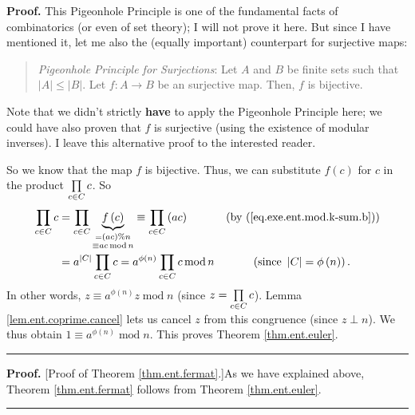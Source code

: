 \documentclass[numbers=enddot,12pt,final,onecolumn,notitlepage]{scrartcl}%
\numberwithin{exer}{subsection}
\theoremstyle{definition}
\newenvironment{statement}{\begin{quote}}{\end{quote}}
\newenvironment{proof}[1][Proof]{\noindent\textbf{#1.} }{\ \rule{0.5em}{0.5em}}
\let\prodnonlimits\prod
\renewcommand{\prod}{\prodnonlimits\limits}
\begin{document}
\begin{proof}
This Pigeonhole Principle is one of the fundamental facts of combinatorics (or
even of set theory); I will not prove it here. But since I have mentioned it,
let me also the (equally important) counterpart for surjective maps:

\begin{statement}
\textit{Pigeonhole Principle for Surjections}: Let $A$ and $B$ be finite sets
such that $\left\vert A\right\vert \leq\left\vert B\right\vert $. Let
$f:A\rightarrow B$ be an surjective map. Then, $f$ is bijective.
\end{statement}

Note that we didn't strictly \textbf{have} to apply the Pigeonhole Principle
here; we could have also proven that $f$ is surjective (using the existence of
modular inverses). I leave this alternative proof to the interested reader.

So we know that the map $f$ is bijective. Thus, we can substitute $f\left(
c\right)  $ for $c$ in the product $\prod\limits_{c\in C}c$. So%
\begin{align*}
\prod_{c\in C}c  &  =\prod_{c\in C}\underbrace{f\left(  c\right)
}_{\substack{=\left(  ac\right)  \%n\\\equiv ac\operatorname{mod}n}%
}\equiv\prod_{c\in C}\left(  ac\right)  \ \ \ \ \ \ \ \ \ \ \left(  \text{by
(\ref{eq.exe.ent.mod.k-sum.b})}\right) \\
&  =a^{\left\vert C\right\vert }\prod_{c\in C}c=a^{\phi\left(  n\right)
}\prod_{c\in C}c\operatorname{mod}n\ \ \ \ \ \ \ \ \ \ \left(  \text{since
}\left\vert C\right\vert =\phi\left(  n\right)  \right)  .
\end{align*}
In other words, $z\equiv a^{\phi\left(  n\right)  }z\operatorname{mod}n$
(since $z=\prod\limits_{c\in C}c$). Lemma \ref{lem.ent.coprime.cancel} lets us
cancel $z$ from this congruence (since $z\perp n$). We thus obtain $1\equiv
a^{\phi\left(  n\right)  }\operatorname{mod}n$. This proves Theorem
\ref{thm.ent.euler}.
\end{proof}

\begin{proof}
[Proof of Theorem \ref{thm.ent.fermat}.]As we have explained above, Theorem
\ref{thm.ent.fermat} follows from Theorem \ref{thm.ent.euler}.
\end{proof}
\end{document}
